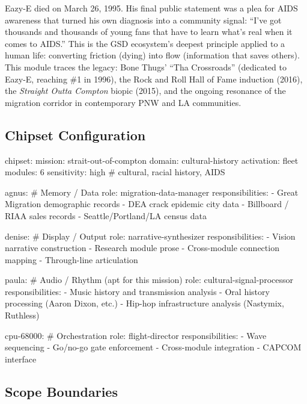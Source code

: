 \documentclass[11pt,letterpaper]{article}
\begin{document}
Eazy-E died on March 26, 1995. His final public statement was a plea for AIDS awareness that turned his own diagnosis into a community signal: ``I've got thousands and thousands of young fans that have to learn what's real when it comes to AIDS.'' This is the GSD ecosystem's deepest principle applied to a human life: converting friction (dying) into flow (information that saves others). This module traces the legacy: Bone Thugs' ``Tha Crossroads'' (dedicated to Eazy-E, reaching \#1 in 1996), the Rock and Roll Hall of Fame induction (2016), the \textit{Straight Outta Compton} biopic (2015), and the ongoing resonance of the migration corridor in contemporary PNW and LA communities.

\subsection{Chipset Configuration}

\begin{asciibox}
chipset:
  mission: strait-out-of-compton
  domain: cultural-history
  activation: fleet
  modules: 6
  sensitivity: high  # cultural, racial history, AIDS

  agnus:  # Memory / Data
    role: migration-data-manager
    responsibilities:
      - Great Migration demographic records
      - DEA crack epidemic city data
      - Billboard / RIAA sales records
      - Seattle/Portland/LA census data

  denise:  # Display / Output
    role: narrative-synthesizer
    responsibilities:
      - Vision narrative construction
      - Research module prose
      - Cross-module connection mapping
      - Through-line articulation

  paula:  # Audio / Rhythm (apt for this mission)
    role: cultural-signal-processor
    responsibilities:
      - Music history and transmission analysis
      - Oral history processing (Aaron Dixon, etc.)
      - Hip-hop infrastructure analysis (Nastymix, Ruthless)

  cpu-68000:  # Orchestration
    role: flight-director
    responsibilities:
      - Wave sequencing
      - Go/no-go gate enforcement
      - Cross-module integration
      - CAPCOM interface
\end{asciibox}

\subsection{Scope Boundaries}
\end{document}
